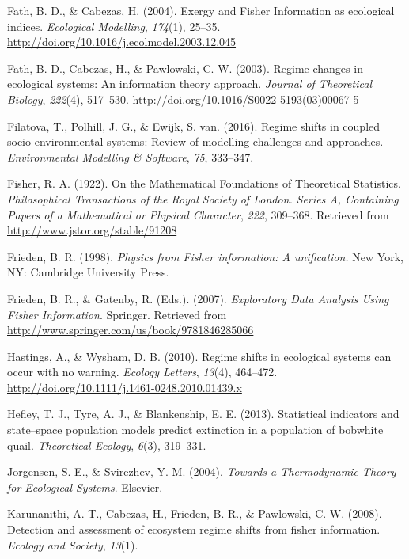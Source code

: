\documentclass[12pt,twoside,openany]{reedthesis}
\begin{document}
\hypertarget{ref-fath_exergy_2004}{}
Fath, B. D., \& Cabezas, H. (2004). Exergy and Fisher Information as
ecological indices. \emph{Ecological Modelling}, \emph{174}(1), 25--35.
\url{http://doi.org/10.1016/j.ecolmodel.2003.12.045}

\hypertarget{ref-fath_regime_2003}{}
Fath, B. D., Cabezas, H., \& Pawlowski, C. W. (2003). Regime changes in
ecological systems: An information theory approach. \emph{Journal of
Theoretical Biology}, \emph{222}(4), 517--530.
\url{http://doi.org/10.1016/S0022-5193(03)00067-5}

\hypertarget{ref-filatova2016regime}{}
Filatova, T., Polhill, J. G., \& Ewijk, S. van. (2016). Regime shifts in
coupled socio-environmental systems: Review of modelling challenges and
approaches. \emph{Environmental Modelling \& Software}, \emph{75},
333--347.

\hypertarget{ref-fisher_mathematical_1922}{}
Fisher, R. A. (1922). On the Mathematical Foundations of Theoretical
Statistics. \emph{Philosophical Transactions of the Royal Society of
London. Series A, Containing Papers of a Mathematical or Physical
Character}, \emph{222}, 309--368. Retrieved from
\url{http://www.jstor.org/stable/91208}

\hypertarget{ref-frieden_physics_1998}{}
Frieden, B. R. (1998). \emph{Physics from Fisher information: A
unification.} New York, NY: Cambridge University Press.

\hypertarget{ref-frieden_exploratory_2007}{}
Frieden, B. R., \& Gatenby, R. (Eds.). (2007). \emph{Exploratory Data
Analysis Using Fisher Information}. Springer. Retrieved from
\url{http://www.springer.com/us/book/9781846285066}

\hypertarget{ref-hastings_regime_2010}{}
Hastings, A., \& Wysham, D. B. (2010). Regime shifts in ecological
systems can occur with no warning. \emph{Ecology Letters}, \emph{13}(4),
464--472. \url{http://doi.org/10.1111/j.1461-0248.2010.01439.x}

\hypertarget{ref-hefley2013statistical}{}
Hefley, T. J., Tyre, A. J., \& Blankenship, E. E. (2013). Statistical
indicators and state--space population models predict extinction in a
population of bobwhite quail. \emph{Theoretical Ecology}, \emph{6}(3),
319--331.

\hypertarget{ref-jorgensen_towards_2004}{}
Jorgensen, S. E., \& Svirezhev, Y. M. (2004). \emph{Towards a
Thermodynamic Theory for Ecological Systems}. Elsevier.

\hypertarget{ref-karunanithi_detection_2008}{}
Karunanithi, A. T., Cabezas, H., Frieden, B. R., \& Pawlowski, C. W.
(2008). Detection and assessment of ecosystem regime shifts from fisher
information. \emph{Ecology and Society}, \emph{13}(1).
\end{document}

